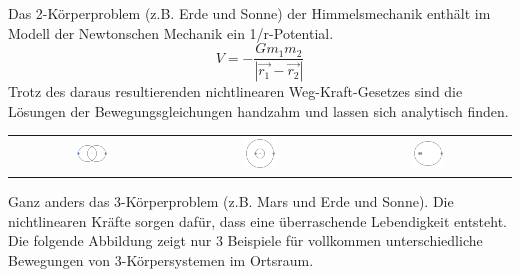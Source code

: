 \documentclass[12pt]{book}
\begin{document}
Das 2-Körperproblem (z.B. Erde und Sonne) der Himmelsmechanik enthält im Modell der Newtonschen Mechanik ein 1/r-Potential.
\begin{equation*}
V = - \frac{G m_1 m_2}{|\vec{r_1} - \vec{r_2}|}
\end{equation*}
Trotz des daraus resultierenden nichtlinearen Weg-Kraft-Gesetzes sind die Lösungen der Bewegungsgleichungen handzahm und lassen sich analytisch finden.

\begin{center}
\begin{tabular}{c c c}
\includegraphics[width=0.2\textwidth]{Bilder/Binary_system_orbit_q=1_e=0dot5.png}
&
\includegraphics[width=0.2\textwidth]{Bilder/Binary_system_orbit_q=3_e=0.png}
&
\includegraphics[width=0.2\textwidth]{Bilder/Binary_system_orbit_q=10_e=0dot5.png}
\end{tabular}
\end{center}

Ganz anders das 3-Körperproblem (z.B. Mars und Erde und Sonne). Die nichtlinearen Kräfte sorgen dafür, dass eine überraschende Lebendigkeit entsteht. Die folgende Abbildung zeigt nur 3 Beispiele für vollkommen unterschiedliche Bewegungen von 3-Körpersystemen im Ortsraum.
\end{document}
